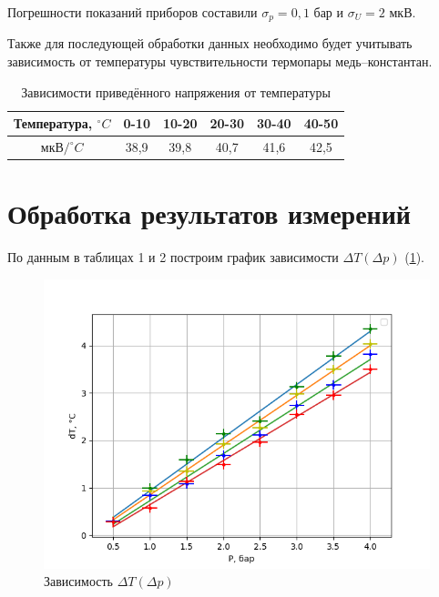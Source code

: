 \documentclass[a4paper,12pt]{article} %
\begin{document}
Погрешности показаний приборов составили 
    $\sigma_p=0,1$ бар и 
    $\sigma_U=2$ мкВ.
    
Также для последующей обработки данных необходимо будет учитывать зависимость от температуры чувствительности термопары медь--константан.

\begin{table}[H]
    \begin{tabular}{|c|c|c|c|c|c|}
    \hline
    Температура, $^\circ C$ & 0-10 & 10-20 & 20-30 & 30-40 & 40-50 \\ \hline
    мкВ$/^\circ C$ & 38,9 & 39,8 & 40,7 & 41,6 & 42,5 \\ \hline
    \end{tabular}
    \label{sensitivity}
    \caption {Зависимости приведённого напряжения от температуры}
\end{table}

\section{Обработка результатов измерений}

По данным в таблицах 1 и 2 построим график зависимости $\Delta T(\Delta p)$ (\ref{DTDP}).

\begin{figure}[H]
    \centering
    \includegraphics[scale=0.95]{all.png}
    \caption{Зависимость $\Delta T(\Delta p)$}
    \label{DTDP}
\end{figure}
\end{document}
